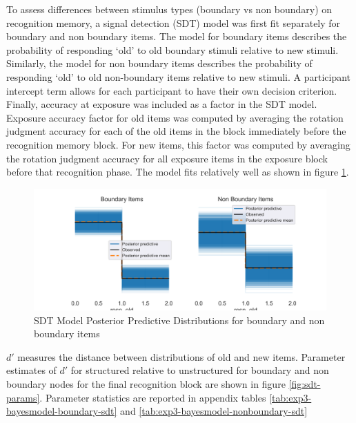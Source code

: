 To assess differences between stimulus types (boundary vs non boundary) on recognition memory, a signal detection (SDT) model was first fit separately for boundary and non boundary items. The model for boundary items describes the probability of responding `old' to old boundary stimuli relative to new stimuli. Similarly, the model for non boundary items describes the probability of responding `old' to old non-boundary items relative to new stimuli. A participant intercept term allows for each participant to have their own decision criterion. Finally, accuracy at exposure was included as a factor in the SDT model. Exposure accuracy factor for old items was computed by averaging the rotation judgment accuracy for each of the old items in the block immediately before the recognition memory block. For new items, this factor was computed by averaging the rotation judgment accuracy for all exposure items in the exposure block before that recognition phase. The model fits relatively well as shown in figure \ref{fig:exp2-sdt-fits}.

\begin{figure}
    \centering
    \label{fig:exp2-sdt-fits}
    \includegraphics[width = \textwidth]{chapter_notebooks/chapter_3/figures/ppc_sdt_model.png}
    \caption{SDT Model Posterior Predictive Distributions for boundary and non boundary items}
\end{figure}

$d'$ measures the distance between distributions of old and new items. Parameter estimates of $d'$ for structured relative to unstructured for boundary and non boundary nodes for the final recognition block are shown in figure \ref{fig:sdt-params}. Parameter statistics are reported in appendix tables \ref{tab:exp3-bayesmodel-boundary-sdt} and \ref{tab:exp3-bayesmodel-nonboundary-sdt}

